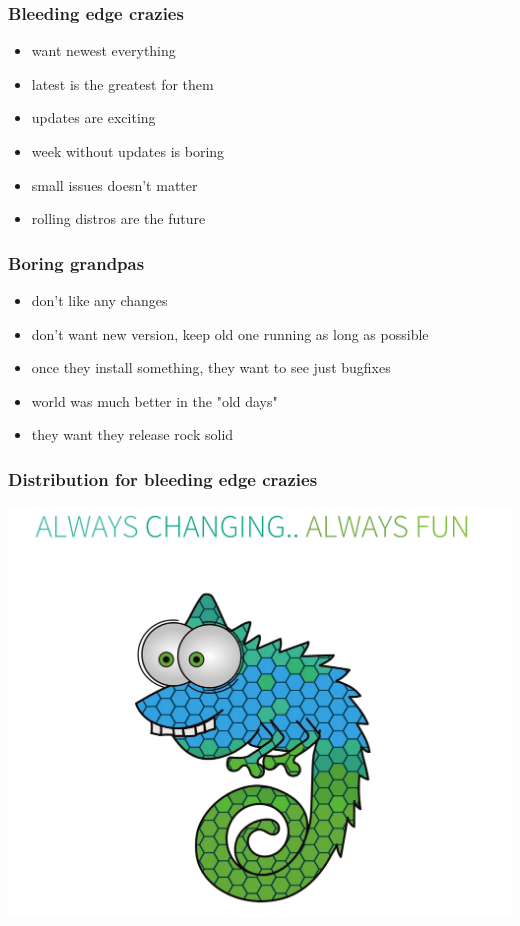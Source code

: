 \documentclass{beamer}
\begin{document}
\begin{frame}[t]
\frametitle{Bleeding edge crazies}
\begin{itemize}
\item want newest everything
\item latest is the greatest for them
\item updates are exciting
\item week without updates is boring
\item small issues doesn't matter
\item rolling distros are the future
\end{itemize}
\end{frame}

\begin{frame}[t]
\frametitle{Boring grandpas}
\begin{itemize}
\item don't like any changes
\item don't want new version, keep old one running as long as possible
\item once they install something, they want to see just bugfixes
\item world was much better in the "old days"
\item they want they release rock solid
\end{itemize}
\end{frame}


\begin{frame}[t]
\frametitle{Distribution for bleeding edge crazies}
\begin{center}
\includegraphics[height=.7\paperheight]{always-changing}
\end{center}
\end{frame}
\end{document}
